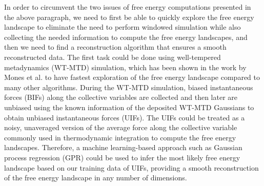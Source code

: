 \begin{spacing}{2.0}
    In order to circumvent the two issues of free energy computations presented in the above paragraph, we need to first be able to quickly explore 
    the free energy landscape to eliminate the need to perform windowed simulation while also collecting the needed information to compute the free 
    energy landscapes, and then we need to find a reconstruction algorithm that ensures a smooth reconstructed data. The first task could be done 
    using well-tempered metadynamics (WT-MTD) simulation, which has been shown in the work by Mones et al. to have fastest exploration of the free 
    energy landscape compared to many other algorithms. \cite{P-JCTC-2016-v12-Mones} During the WT-MTD simulation, biased instantaneous forces (BIFs) 
    along the collective variables are collected and then later are unbiased using the known information of the deposited WT-MTD Gaussians to obtain 
    unbiased instantaneous forces (UIFs). The UIFs could be treated as a noisy, unaveraged version of the average force along the collective variable 
    commonly used in thermodynamic integration to compute the free energy landscapes. Therefore, a machine learning-based approach such as Gaussian 
    process regression (GPR) could be used to infer the most likely free energy landscape based on our training data of UIFs, providing a smooth 
    reconstruction of the free energy landscape in any number of dimensions. \cite{P-JCTC-2014-v10-Stecher, P-JCTC-2016-v12-Mones}

\end{spacing}
